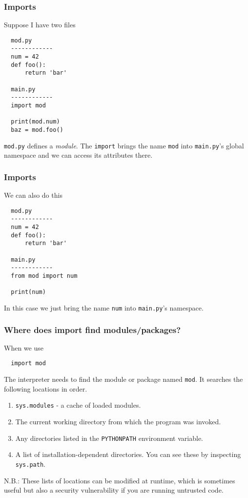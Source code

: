 \documentclass[10pt]{beamer}
\begin{document}
\begin{frame}[fragile]
  \frametitle{Imports}
  
  Suppose I have two files
  \begin{verbatim}
  mod.py
  ------------
  num = 42
  def foo():
      return 'bar'
  
  main.py
  ------------
  import mod
  
  print(mod.num)
  baz = mod.foo()
  \end{verbatim}
  \texttt{mod.py} defines a \emph{module}. The \texttt{import} brings the 
  name \texttt{mod} into \texttt{main.py}'s global namespace and we can access
  its attributes there.
\end{frame}
  
\begin{frame}[fragile]
  \frametitle{Imports}
  
  We can also do this
  \begin{verbatim}
  mod.py
  ------------
  num = 42
  def foo():
      return 'bar'
  
  main.py
  ------------
  from mod import num
  
  print(num)
  \end{verbatim}
  
  In this case we just bring the name \texttt{num} into \texttt{main.py}'s namespace.

\end{frame}

\begin{frame}[fragile]
  \frametitle{Where does import find modules/packages?}
  
  When we use
  \begin{verbatim}
  import mod
  \end{verbatim}
  
  The interpreter needs to find the module or package named \texttt{mod}. It searches
  the following locations in order.
  \begin{enumerate}
    \item \texttt{sys.modules} - a cache of loaded modules.
    \item The current working directory from which the program was invoked.
    \item Any directories listed in the \texttt{PYTHONPATH} environment variable.
    \item A list of installation-dependent directories. You can see these by inspecting \texttt{sys.path}.
  \end{enumerate}
  N.B.: These lists of locations can be modified at runtime, which is sometimes useful but also a security vulnerability if
  you are running untrusted code.  

\end{frame}
\end{document}
